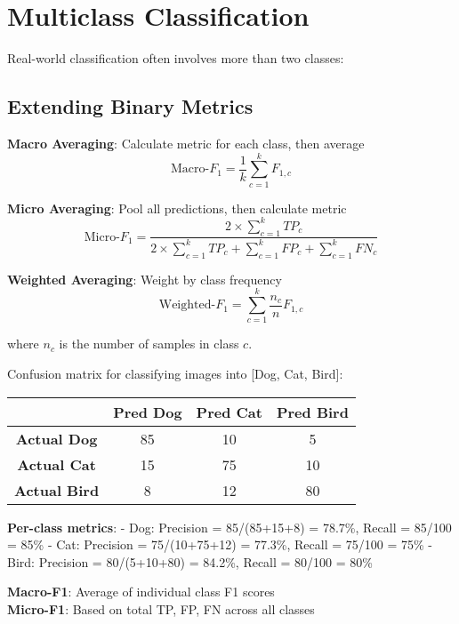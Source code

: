 \documentclass{article}
\newcounter{example}
\begin{document}
\section{Multiclass Classification}

Real-world classification often involves more than two classes:

\subsection{Extending Binary Metrics}

\textbf{Macro Averaging}: Calculate metric for each class, then average
$$\text{Macro-}F_1 = \frac{1}{k} \sum_{c=1}^k F_{1,c}$$

\textbf{Micro Averaging}: Pool all predictions, then calculate metric
$$\text{Micro-}F_1 = \frac{2 \times \sum_{c=1}^k TP_c}{2 \times \sum_{c=1}^k TP_c + \sum_{c=1}^k FP_c + \sum_{c=1}^k FN_c}$$

\textbf{Weighted Averaging}: Weight by class frequency
$$\text{Weighted-}F_1 = \sum_{c=1}^k \frac{n_c}{n} F_{1,c}$$

where $n_c$ is the number of samples in class $c$.

\begin{tcolorbox}[colback=teal!5!white,colframe=teal!75!black,title=Example \stepcounter{example}\#\theexample: Image Classification (3 classes)]
Confusion matrix for classifying images into [Dog, Cat, Bird]:

\begin{center}
\begin{tabular}{|c|c|c|c|}
\hline
& \textbf{Pred Dog} & \textbf{Pred Cat} & \textbf{Pred Bird} \\
\hline
\textbf{Actual Dog} & 85 & 10 & 5 \\
\hline
\textbf{Actual Cat} & 15 & 75 & 10 \\
\hline
\textbf{Actual Bird} & 8 & 12 & 80 \\
\hline
\end{tabular}
\end{center}

\textbf{Per-class metrics}:
- Dog: Precision = 85/(85+15+8) = 78.7\%, Recall = 85/100 = 85\%
- Cat: Precision = 75/(10+75+12) = 77.3\%, Recall = 75/100 = 75\%  
- Bird: Precision = 80/(5+10+80) = 84.2\%, Recall = 80/100 = 80\%

\textbf{Macro-F1}: Average of individual class F1 scores\\
\textbf{Micro-F1}: Based on total TP, FP, FN across all classes
\end{tcolorbox}
\end{document}
